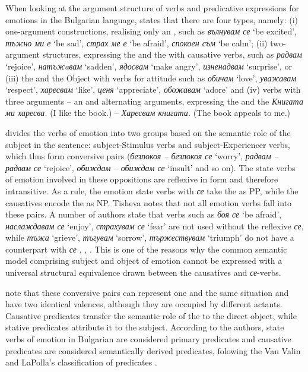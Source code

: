 \documentclass[output=paper,colorlinks,citecolor=brown]{langscibook}
\begin{document}
When looking at the argument structure of verbs and predicative expressions for emotions in the Bulgarian language, \citet{dineva2000} states that there are four types, namely: (i) one-argument constructions, realising only an , such as \textit{вълнувам се} `be excited', \textit{тъжно ми е} `be sad', \textit{страх ме е} `be afraid', \textit{спокоен съм} `be calm'; (ii) two-argument structures, expressing the  and the  with causative verbs, such as \textit{радвам} `rejoice', \textit{натъ\-жaвам} `sadden', \textit{ядосвам} `make angry', \textit{изненадвам} `surprise', or (iii) the  and the Object with verbs for attitude such as \textit{обичам} `love', \textit{уважавам} `respect', \textit{харесвам} `like', \textit{ценя} `appreciate', \textit{обожавам} `adore' and (iv) verbs with three arguments -- an  and alternating arguments, expressing the  and the  \textit{Книгата ми харесва.} (I like the book.)  – \textit{Харесвам книга\-та.} ({The book appeals to me.})

\citet [102]{tisheva2022положителни} divides the verbs of emotion into two groups based on the semantic role of the subject in the sentence: subject\hyp Stimulus verbs and subject\hyp Experiencer verbs, which thus form conversive pairs (\textit{безпокоя – безпокоя се} `wor\-ry', \textit{радвам -- радвам се} `rejoice', \textit{обиждам – обиждам се} `insult' and so on). The state verbs of emotion involved in these oppositions are reflexive in form and therefore intransitive.  As a rule, the emotion state verbs with \textit{се} take the  as PP, while the causatives encode the  as NP. Tisheva notes that not all emotion verbs fall into these pairs. A number of authors state that verbs such as \textit{боя се} `be afraid', \textit{наслаждавам се} `enjoy', \textit{страхувам се} `fear' are not used without the reflexive \textit{се}, while \textit{тъжа} `grieve', \textit{тъгувам} `sorrow', \textit{тържествувам} `triumph' do not have a counterpart with \textit{се} \citep [24]{коева1996класификация}, \citep [232]{Nitsolova2008}, \citep[101--102]{tisheva2022положителни}. This is one of the reasons why the common semantic model comprising subject and object of emotion cannot be expressed with a universal structural equivalence drawn between the causatives and \textit{се}-verbs. 


\citet [394]{tisheva2022syntactic} note that these conversive pairs can represent one and the same situation and have two identical valences, although they are occupied by different actants. Causative predicates transfer the semantic role of the  to the direct object, while stative predicates attribute it to the subject. According to the authors, state verbs of emotion in Bulgarian are considered primary predicates and causative predicates are considered semantically derived predicates, folowing the Van Valin and LaPolla's classification of predicates \citep{VanValinLaPolla1997}.
\end{document}
